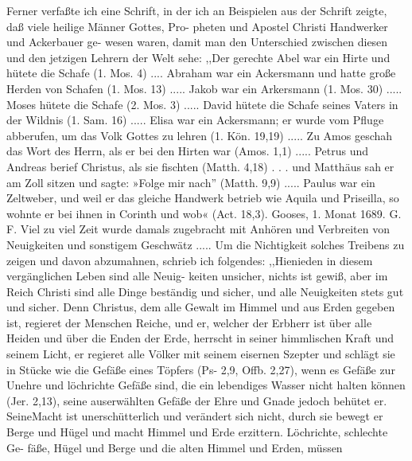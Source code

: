 Ferner verfaßte ich eine Schrift, in der ich an Beispielen
aus der Schrift zeigte, daß viele heilige Männer Gottes, Pro-
pheten und Apostel Christi Handwerker und Ackerbauer ge-
wesen waren, damit man den Unterschied zwischen diesen und den
jetzigen Lehrern der Welt sehe:
,,Der gerechte Abel war ein Hirte und hütete die Schafe
(1. Mos. 4) .... Abraham war ein Ackersmann und hatte
große Herden von Schafen (1. Mos. 13) ..... Jakob war ein
Arkersmann (1. Mos. 30) ..... Moses hütete die Schafe
(2. Mos. 3) ..... David hütete die Schafe seines Vaters in
der Wildnis (1. Sam. 16) ..... Elisa war ein Ackersmann;
er wurde vom Pfluge abberufen, um das Volk Gottes zu lehren
(1. Kön. 19,19) ..... Zu Amos geschah das Wort des Herrn,
als er bei den Hirten war (Amos. 1,1) ..... Petrus und
Andreas berief Christus, als sie fischten (Matth. 4,18) . . . und
Matthäus sah er am Zoll sitzen und sagte: »Folge mir nach''
(Matth. 9,9) ..... Paulus war ein Zeltweber, und weil er
das gleiche Handwerk betrieb wie Aquila und Priseilla, so wohnte
er bei ihnen in Corinth und wob« (Act. 18,3).
Gooses, 1. Monat 1689. G. F.
Viel zu viel Zeit wurde damals zugebracht mit Anhören und
Verbreiten von Neuigkeiten und sonstigem Geschwätz ..... Um die
Nichtigkeit solches Treibens zu zeigen und davon abzumahnen,
schrieb ich folgendes:
,,Hienieden in diesem vergänglichen Leben sind alle Neuig-
keiten unsicher, nichts ist gewiß, aber im Reich Christi sind alle
Dinge beständig und sicher, und alle Neuigkeiten stets gut und
sicher. Denn Christus, dem alle Gewalt im Himmel und aus
Erden gegeben ist, regieret der Menschen Reiche, und er, welcher
der Erbherr ist über alle Heiden und über die Enden der Erde,
herrscht in seiner himmlischen Kraft und seinem Licht, er regieret
alle Völker mit seinem eisernen Szepter und schlägt sie in Stücke
wie die Gefäße eines Töpfers (Ps- 2,9, Offb. 2,27), wenn es
Gefäße zur Unehre und löchrichte Gefäße sind, die ein lebendiges
Wasser nicht halten können (Jer. 2,13), seine auserwählten Gefäße
der Ehre und Gnade jedoch behütet er. SeineMacht ist unerschütterlich
und verändert sich nicht, durch sie bewegt er Berge und Hügel
und macht Himmel und Erde erzittern. Löchrichte, schlechte Ge-
fäße, Hügel und Berge und die alten Himmel und Erden, müssen


